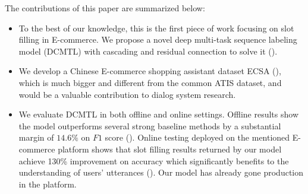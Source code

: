 The contributions of this paper are summarized below:
\begin{itemize}
	\item To the best of our knowledge, this is the first piece of work focusing on slot filling in E-commerce. 
	We propose a novel deep multi-task 
	sequence labeling model (DCMTL) with cascading and 
	residual connection to solve it ().
	\item We develop a Chinese E-commerce shopping assistant dataset 
	ECSA (), which is much bigger and different from 
	the common ATIS dataset, and would be a valuable contribution to 
	dialog system research.  
	\item We evaluate DCMTL in both offline and online settings.
	Offline results show the model outperforms 
	several strong baseline methods by a substantial margin of $14.6\%$ on $F1$ score ().
	Online testing deployed on the mentioned E-commerce platform shows that 
	slot filling results returned by our model achieve 130\% improvement 
	on accuracy which significantly benefits to the understanding of users' utterances ().
	Our model has already gone production in the platform.
\end{itemize}

